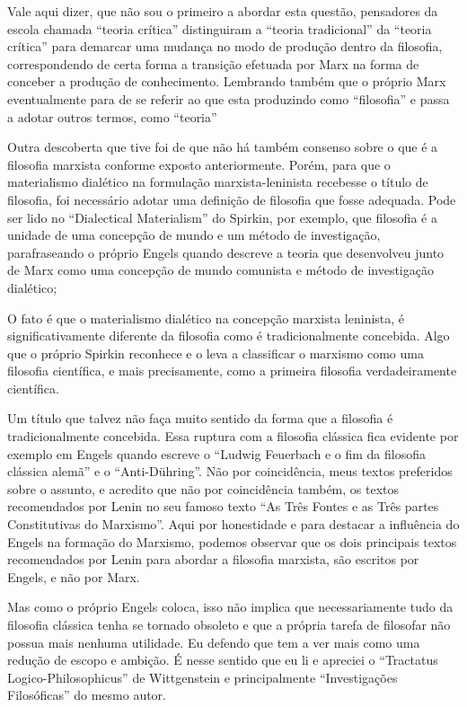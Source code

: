 Vale aqui dizer, que não sou o primeiro a abordar esta questão, pensadores da escola chamada ``teoria crítica'' distinguiram a ``teoria tradicional'' da ``teoria crítica'' para demarcar uma mudança no modo de produção dentro da filosofia, correspondendo de certa forma a transição efetuada por Marx na forma de conceber a produção de conhecimento\cite{glauber2}.  Lembrando também que o próprio Marx eventualmente para de se referir ao que esta produzindo como ``filosofia'' e passa a adotar outros termos, como ``teoria''\cite{nildo}

Outra descoberta que tive foi de que não há também consenso sobre o que é a filosofia marxista conforme exposto anteriormente. Porém, para que o materialismo dialético na formulação marxista-leninista recebesse o título de filosofia, foi necessário adotar uma definição de filosofia que fosse adequada. Pode ser lido no “Dialectical Materialism” do Spirkin, por exemplo, que filosofia é a unidade de uma concepção de mundo e um método de investigação, parafraseando o próprio Engels quando descreve a teoria que desenvolveu junto de Marx como uma concepção de mundo comunista e método de investigação dialético; 

O fato é que o materialismo dialético na concepção marxista leninista, é significativamente diferente da filosofia como é tradicionalmente concebida. Algo que o próprio Spirkin reconhece e o leva a classificar o marxismo como uma filosofia científica, e mais precisamente, como a primeira filosofia verdadeiramente científica. 

Um título que talvez não faça muito sentido da forma que a filosofia é tradicionalmente concebida. Essa ruptura com a filosofia clássica fica evidente por exemplo em Engels quando escreve o “Ludwig Feuerbach e o fim da filosofia clássica alemã” e o “Anti-Dühring”. Não por coincidência, meus textos preferidos sobre o assunto, e acredito que não por coincidência também, os textos recomendados por Lenin no seu famoso texto ``As Três Fontes e as Três partes Constitutivas do Marxismo''. Aqui por honestidade e para destacar a influência do Engels na formação do Marxismo, podemos observar que os dois principais textos recomendados por Lenin para abordar a filosofia marxista, são escritos por Engels, e não por Marx.

Mas como o próprio Engels coloca, isso não implica que necessariamente tudo da filosofia clássica tenha se tornado obsoleto e que a própria tarefa de filosofar não possua mais nenhuma utilidade. Eu defendo que tem a ver mais como uma redução de escopo e ambição. É nesse sentido que eu li e apreciei o “Tractatus Logico-Philosophicus” de Wittgenstein e principalmente “Investigações Filosóficas” do mesmo autor. 

